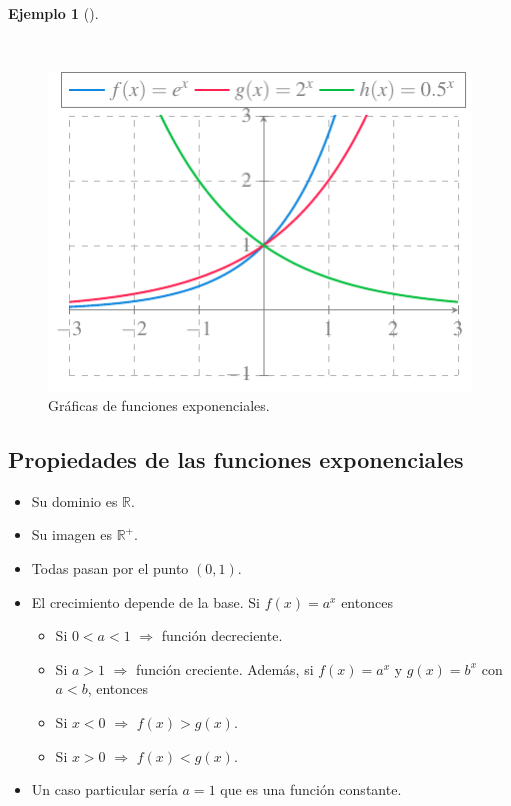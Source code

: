\documentclass[
  a4paper,
]{scrreport}
\providecommand{\tightlist}{%
  \setlength{\itemsep}{0pt}\setlength{\parskip}{0pt}}\usepackage{longtable,booktabs,array}
\theoremstyle{definition}
\newtheorem{example}{Ejemplo}[chapter]
\theoremstyle{plain}
\theoremstyle{definition}
\theoremstyle{definition}
\theoremstyle{plain}
\theoremstyle{plain}
\theoremstyle{remark}
\begin{document}
\begin{example}[]\protect\hypertarget{exm-funcion-exponencial}{}\label{exm-funcion-exponencial}

~

\begin{figure}[H]

{\centering \includegraphics{./img/funciones/funcion-exponencial.pdf}

}

\caption{Gráficas de funciones exponenciales.}

\end{figure}%

\end{example}

\subsection{Propiedades de las funciones
exponenciales}\label{propiedades-de-las-funciones-exponenciales}

\begin{itemize}
\tightlist
\item
  Su dominio es \(\mathbb{R}\).
\item
  Su imagen es \(\mathbb{R}^+\).
\item
  Todas pasan por el punto \((0,1)\).
\item
  El crecimiento depende de la base. Si \(f(x)=a^x\) entonces

  \begin{itemize}
  \tightlist
  \item
    Si \(0<a<1\) \(\Rightarrow\) función decreciente.
  \item
    Si \(a>1\) \(\Rightarrow\) función creciente. Además, si
    \(f(x)=a^x\) y \(g(x)=b^x\) con \(a<b\), entonces
  \item
    Si \(x<0\) \(\Rightarrow\) \(f(x)>g(x)\).
  \item
    Si \(x>0\) \(\Rightarrow\) \(f(x)<g(x)\).
  \end{itemize}
\item
  Un caso particular sería \(a=1\) que es una función constante.
\end{itemize}
\end{document}
